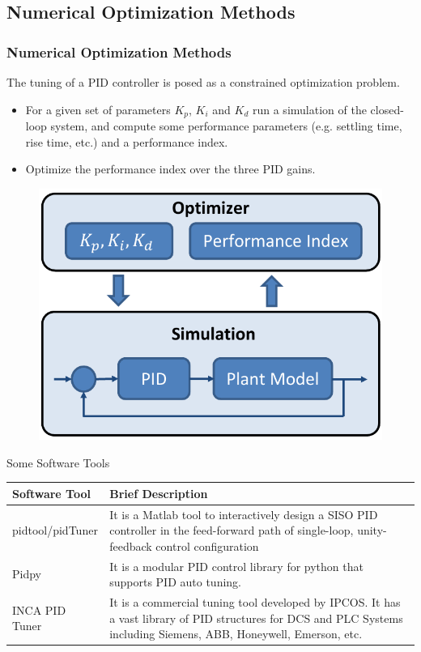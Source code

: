 \subsection{Numerical Optimization Methods}

\begin{frame}
	\small{
	\frametitle{Numerical Optimization Methods}
	The tuning of a PID controller is posed as a constrained optimization problem.  
	{\footnotesize
	\begin{itemize}
			\item For a given set of parameters $K_p$, $K_i$ and $K_d$ run a simulation of the closed-loop system, and compute some performance parameters (e.g. settling time, rise time, etc.) and a performance index.
			\item Optimize the performance index over the three PID gains.
	\end{itemize}}
	}
	\begin{figure}
	\includegraphics[width=0.5\linewidth]{num_opt}
	\end{figure}	
\end{frame}

\begin{frame}{Some Software Tools}
	\small{
	\begin{tabular}{|p{3cm}|p{7cm}|}
		\hline Software Tool  & Brief Description  \\ 
		\hline pidtool/pidTuner
		 & It is a Matlab tool to interactively design a SISO PID controller in the feed-forward path of single-loop, unity-feedback control configuration \\ 
		\hline Pidpy
		 & It is a modular PID control library for python that supports PID auto tuning. {\color{blue}{\url{https://pypi.python.org/pypi/pypid/}}}
		 \\ 
		\hline INCA PID Tuner
		 & It is a commercial tuning tool developed by IPCOS. It has a vast library of PID structures for DCS and PLC  Systems including Siemens, ABB, Honeywell, Emerson, etc.
		 {\color{blue}{\url{http://www.ipcos.com/advancedprocesscontrol/advanced-process-control/pid-tuning-software/inca-pid-tuning/}}}
		 \\ 
		\hline 
	\end{tabular}}
\end{frame}

